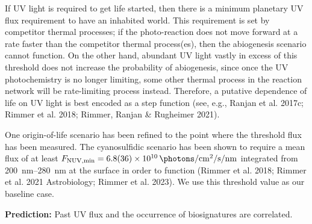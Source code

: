 \documentclass[twocolumn,twocolappendix,linenumbers]{aastex631}
\begin{document}
If UV light is required to get life started, then there is a minimum planetary UV flux requirement to have an inhabited world.
This requirement is set by competitor thermal processes; if the photo-reaction does not move forward at a rate faster than the competitor thermal process(es), then the abiogenesis scenario cannot function.
On the other hand, abundant UV light vastly in excess of this threshold does not increase the probability of abiogenesis, since once the UV photochemistry is no longer limiting, some other thermal process in the reaction network will be rate-limiting process instead.
Therefore, a putative dependence of life on UV light is best encoded as a step function (see, e.g., Ranjan et al. 2017c; Rimmer et al. 2018; Rimmer, Ranjan \& Rugheimer 2021).

One origin-of-life scenario has been refined to the point where the threshold flux has been measured.
The cyanosulfidic scenario has been shown to require a mean flux of at least $ F_\mathrm{NUV, min} = \SI{6.8\pm3.6 e10}{\photons\per\centi\meter\squared\per\second\per\nano\meter}$ integrated from \SIrange{200}{280}{\nano\meter} at the surface in order to function (Rimmer et al. 2018; Rimmer et al. 2021 Astrobiology; Rimmer et al. 2023).
We use this threshold value as our baseline case.

\textbf{Prediction:} Past UV flux and the occurrence of biosignatures are correlated.
\end{document}

